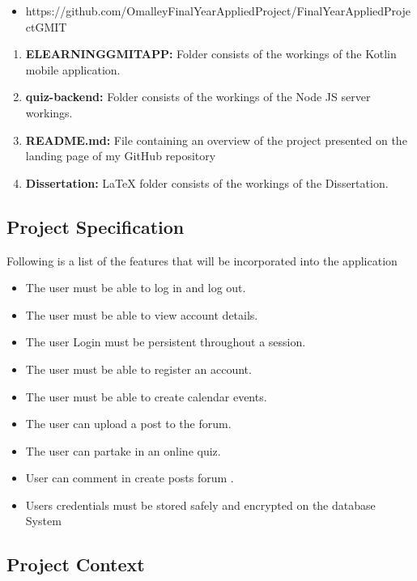         \begin{itemize}
            \item https://github.com/OmalleyFinalYearAppliedProject/FinalYearAppliedProjectGMIT
        \end{itemize}
        
        \begin{enumerate}
  \item \textbf{ELEARNINGGMITAPP:} Folder consists of the workings of the Kotlin mobile application.
  \item  \textbf{quiz-backend:} Folder consists of the workings of the Node JS server workings.
  \item \textbf{README.md:} File containing an overview of the project presented on the landing page of my GitHub repository
  \item \textbf{Dissertation:}  LaTeX folder consists of the workings of the Dissertation.
\end{enumerate}


    \subsection{Project Specification}
    

    
Following is a list of the features that will be incorporated into the application 
    \begin{itemize}
  \item The user must be able to log in and log out.
  \item The user must be able to view account details.
  \item The user Login must be persistent throughout a session.
  \item The user must be able to register an account.
  \item The user must be able to create calendar events. 
  \item The user can upload a post to the forum.
  \item The user can partake in an online quiz.
  \item User can comment in create posts  forum .
  \item Users credentials must be stored safely and encrypted on the database System
\end{itemize}
    
    
    
    \subsection{Project Context}




